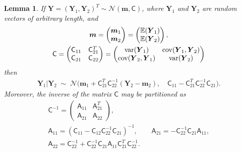 \documentclass{iitthesis}          %
\newcommand{\bm}[1]{\boldsymbol{#1}}
\newcommand{\Ex}{\mathbb{E}}
\newcommand{\vm}{\bm{m}}
\newcommand{\vY}{\bm{Y}}
\newcommand{\mA}{\mathsf{A}}
\newcommand{\mC}{\mathsf{C}}
\newcommand{\cov}{{\textup{cov}}}
\newcommand{\var}{{\textup{var}}}
\newcommand{\calN}{\mathcal{N}}
\newtheorem{lemma}[theorem]{Lemma}
\begin{document}
\begin{lemma} \cite[(A.6), (A.11--13)]{RasWil06a} \label{thrm:condDist} If $\vY = (\vY_1, \vY_2)^T \sim \calN (\vm,\mC)$, where $\vY_1$ and $\vY_2$ are random vectors of arbitrary length, and 
	\begin{gather*}
	\vm = \begin{pmatrix} \vm_1 \\ \vm_2 \end{pmatrix} = \begin{pmatrix} \Ex(\vY_1) \\ \Ex(\vY_2) \end{pmatrix}, \\
	\mC = \begin{pmatrix}
	\mC_{11} & \mC_{21}^T \\ 	\mC_{21} & \mC_{22}
	\end{pmatrix} =
	\begin{pmatrix}
	\var(\vY_{1}) & \cov(\vY_{1}, \vY_2) \\ 	\cov(\vY_2,\vY_{1}) & \var(\vY_{2})
	\end{pmatrix} 
	\end{gather*}
	then 
	\begin{align*}
	\vY_1 \vert \vY_2 \; \sim \; \calN \bigl(\vm_1 + \mC_{21}^T \mC_{22}^{-1}(\vY_2 - \vm_2), \quad \mC_{11} - \mC_{21}^T \mC_{22}^{-1} \mC_{21} \bigr).
	\end{align*}
Moreover, the inverse of the matrix $\mC$ may be partitioned as
\begin{gather*}
\mC^{-1} = \begin{pmatrix} \mA_{11} & \mA_{21}^T \\ \mA_{21} & \mA_{22} \end{pmatrix}, \\
\mA_{11} = (\mC_{11} - \mC_{12} \mC_{22}^{-1} \mC_{21})^{-1}, \qquad 
\mA_{21} = -  \mC_{22}^{-1} \mC_{21} \mA_{11}, \\ 
\mA_{22} = \mC_{22}^{-1} + \mC_{22}^{-1} \mC_{21} \mA_{11} \mC_{21}^T \mC_{22}^{-1}.
\end{gather*}
\end{lemma}
\end{document}

